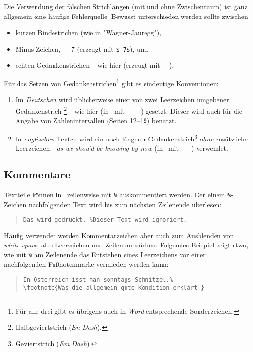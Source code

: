 Die Verwendung der falschen Strichlängen (mit und ohne
Zwischenraum) ist ganz allgemein eine häufige Fehlerquelle.
Bewusst unterschieden werden sollte zwischen
%
\begin{itemize}
\item kurzen Bindestrichen (wie in "Wagner-Jauregg"), %
\item Minus-Zeichen, \zB\ $-7$ (erzeugt mit \verb!$-7$!), und %
\item echten Gedankenstrichen -- wie hier (erzeugt mit \verb!--!).
\end{itemize}
%
\noindent Für das Setzen von Gedankenstrichen\footnote{Für alle
drei gibt es übrigens auch in \emph{Word} entsprechende
Sonderzeichen.} gibt es eindeutige Konventionen:
%
\begin{enumerate}
\item Im \emph{Deutschen} wird üblicherweise einer von zwei
Leerzeichen umgebener Gedankenstrich%
\footnote{Halbgeviertstrich (\emph{En Dash}).} -- wie hier (in
\latex\ mit {\verb*! -- !}) gesetzt. Dieser wird auch für die Angabe von
Zahlenintervallen (Seiten 12--19) benutzt. 
%
\item In \emph{englischen} Texten wird ein noch längerer
Gedankenstrich\footnote{Geviertstrich (\emph{Em Dash}).} \emph{ohne}
zusätzliche Leerzeichen---\emph{as we should be knowing by now}
(in \latex\ mit {\verb*!---!}) verwendet.
%
\end{enumerate}




\subsection{Kommentare}
\label{sec:kommentare}


Textteile können in \latex\ zeilenweise mit \verb!%! auskommentiert werden. Der einem 
\verb!%!-Zeichen nachfolgenden Text wird bis zum nächsten Zeilenende überlesen:
%
\begin{quote}
\verb!Das wird gedruckt. %Dieser Text wird ignoriert.!
\end{quote}
%
Häufig verwendet werden Kommentarzeichen aber auch zum Ausblenden von 
\emph{white space}, also Leerzeichen und Zeilenumbrüchen.
Folgendes Beispiel zeigt etwa, wie mit \verb!%! am Zeilenende das Entstehen
eines Leerzeichens vor einer nachfolgenden Fußnotenmarke vermieden werden kann:
%
\begin{quote}
\begin{verbatim}
In Österreich isst man sonntags Schnitzel.%
\footnote{Was die allgemein gute Kondition erklärt.}
\end{verbatim}
\end{quote}
%

